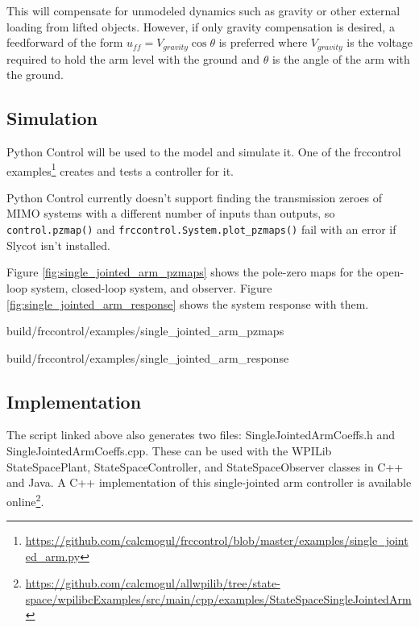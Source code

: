 This will compensate for unmodeled dynamics such as gravity or other external
loading from lifted objects. However, if only gravity compensation is desired,
a feedforward of the form $u_{ff} = V_{gravity} \cos\theta$ is preferred where
$V_{gravity}$ is the voltage required to hold the arm level with the ground and
$\theta$ is the angle of the arm with the ground.

\subsection{Simulation}

Python Control will be used to  the
\gls{model} and simulate it. One of the frccontrol
examples\footnote{\url{https://github.com/calcmogul/frccontrol/blob/master/examples/single_jointed_arm.py}}
creates and tests a controller for it.

\begin{remark}
  Python Control currently doesn't support finding the transmission zeroes of
  MIMO \glspl{system} with a different number of \glspl{input} than
  \glspl{output}, so \texttt{control.pzmap()} and
  \texttt{frccontrol.System.plot\_pzmaps()} fail with an error if Slycot isn't
  installed.
\end{remark}

Figure \ref{fig:single_jointed_arm_pzmaps} shows the pole-zero maps for the
open-loop \gls{system}, closed-loop \gls{system}, and \gls{observer}. Figure
\ref{fig:single_jointed_arm_response} shows the \gls{system} response with them.

\begin{svg}{build/frccontrol/examples/single_jointed_arm_pzmaps}
  \caption{Single-jointed arm pole-zero maps}
  \label{fig:single_jointed_arm_pzmaps}
\end{svg}

\begin{svg}{build/frccontrol/examples/single_jointed_arm_response}
  \caption{Single-jointed arm response}
  \label{fig:single_jointed_arm_response}
\end{svg}

\subsection{Implementation}

The script linked above also generates two files: SingleJointedArmCoeffs.h and
SingleJointedArmCoeffs.cpp. These can be used with the WPILib StateSpacePlant,
StateSpaceController, and StateSpaceObserver classes in C++ and Java. A C++
implementation of this single-jointed arm controller is available
online\footnote{\url{https://github.com/calcmogul/allwpilib/tree/state-space/wpilibcExamples/src/main/cpp/examples/StateSpaceSingleJointedArm}}.
